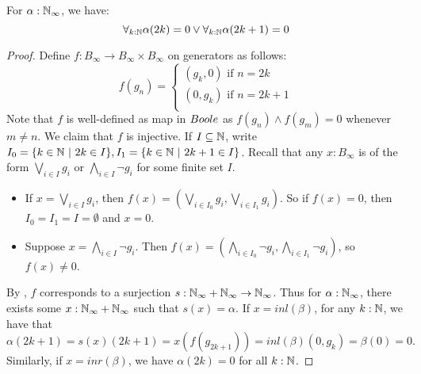 \begin{theorem}\label{LLPO}
  For $\alpha:\mathbb{N}_\infty$, 
  we have: 
  \begin{equation}\label{eqnLLPO}
    \forall_{k:\mathbb{N}} \alpha(2k) = 0  \vee \forall_{k:\mathbb{N}} \alpha(2k+1) = 0
  \end{equation}
\end{theorem}
\begin{proof}
%
  Define $f:B_\infty \to B_\infty \times B_\infty$ on generators as follows:
  \begin{equation}\label{eqnLLPOProofMap}
    f(g_n) =\begin{cases}
      (g_k,0) \text{ if } n = 2k\\
      (0,g_k) \text{ if } n = 2k+1\\
    \end{cases}
  \end{equation}
  Note that $f$ is well-defined as map in $\Boole$ as 
  $f(g_n) \wedge f(g_m) = 0$ whenever $m\neq n$. 
  We claim that $f$ is injective. 
  If $I\subseteq \mathbb{N}$, write 
  $ I_0 =\{k\in \mathbb{N}\ |\ 2k \in I\}, 
    I_1 =\{k\in \mathbb{N}\ |\ 2k+1 \in I\}
  $.
  Recall that any $x:B_\infty$ is of the form 
  $\bigvee_{i\in I} g_i$ or $\bigwedge_{i\in I} \neg g_i$ for some finite set $I$. 
  \begin{itemize}
    \item If $x = \bigvee_{i\in I} g_i$, then 
      $f(x) = (\bigvee_{i\in I_0}g_{i}, \bigvee_{i\in I_1}g_i)$. 
      So if $f(x) = 0$, then $I_0=I_1 = I = \emptyset$ and $x = 0$. 
    \item Suppose 
      $x = \bigwedge_{i\in I} \neg g_i$.
      Then $f(x) = (\bigwedge_{i\in I_0} \neg g_i, \bigwedge_{i\in I_1} \neg g_i)$, 
      so $f(x) \neq 0$. 
  \end{itemize}
  By ,
  $f$ corresponds to a surjection 
  $s:\mathbb{N}_{\infty} + \mathbb{N}_{\infty} \to \mathbb{N}_{\infty}$.
  Thus for $\alpha : \mathbb{N}_{\infty}$, 
  there exists some $x:\mathbb{N}_{\infty} + \mathbb{N}_{\infty}$ such that $s(x) = \alpha$. 
  If $x = inl(\beta)$, 
  for any $k:\mathbb{N}$, we have that 
  $$\alpha ({2k+1}) = s(x) ({2k+1}) = x(f(g_{2k+1})) = inl(\beta) (0,g_k)  = \beta(0) = 0.$$
  Similarly, if $x = inr(\beta)$, we have $\alpha({2k}) = 0$ for all $k:\mathbb{N}$. 
\end{proof}
